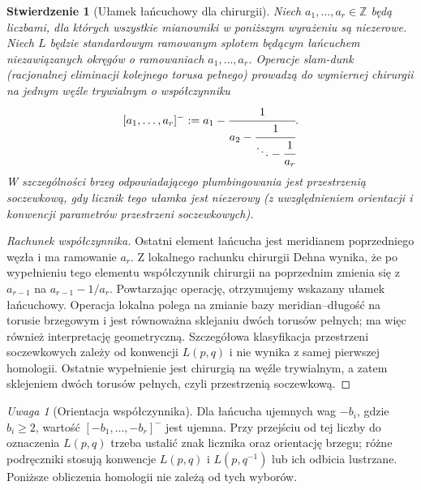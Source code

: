 \documentclass[11pt,a4paper]{report}
\numberwithin{equation}{section}
\theoremstyle{plain}
\newtheorem{stwierdzenie}[twierdzenie]{Stwierdzenie}
\theoremstyle{definition}
\theoremstyle{remark}
\newtheorem{uwaga}[twierdzenie]{Uwaga}
\begin{document}
\begin{stwierdzenie}[Ułamek łańcuchowy dla chirurgii]
Niech $a_1,\dots,a_r\in\mathbb Z$ będą liczbami,
dla których wszystkie mianowniki w poniższym wyrażeniu
są niezerowe. Niech $L$ będzie standardowym ramowanym
splotem będącym łańcuchem niezawiązanych okręgów o
ramowaniach $a_1,\dots,a_r$. Operacje \emph{slam-dunk}
(racjonalnej eliminacji kolejnego torusa pełnego)
prowadzą do wymiernej chirurgii na jednym węźle trywialnym
o współczynniku
\[
[a_1,\dots,a_r]^-:=a_1-\cfrac1{a_2-
\cfrac1{\ddots-\cfrac1{a_r}}}.
\]
W szczególności brzeg odpowiadającego plumbingowania
jest przestrzenią soczewkową, gdy licznik tego ułamka
jest niezerowy (z uwzględnieniem orientacji i konwencji
parametrów przestrzeni soczewkowych).
\end{stwierdzenie}

\begin{proof}[Rachunek współczynnika]
Ostatni element łańcucha jest meridianem poprzedniego
węzła i ma ramowanie $a_r$. Z lokalnego rachunku chirurgii
Dehna wynika, że po wypełnieniu tego elementu
współczynnik chirurgii na poprzednim zmienia się z
$a_{r-1}$ na $a_{r-1}-1/a_r$. Powtarzając operację,
otrzymujemy wskazany ułamek łańcuchowy. Operacja lokalna
polega na zmianie bazy meridian--długość na torusie
brzegowym i jest równoważna sklejaniu dwóch torusów
pełnych; ma więc również interpretację geometryczną.
Szczegółowa klasyfikacja przestrzeni soczewkowych
zależy od konwencji $L(p,q)$ i nie wynika z samej
pierwszej homologii. Ostatnie wypełnienie jest chirurgią
na węźle trywialnym, a zatem sklejeniem dwóch torusów
pełnych, czyli przestrzenią soczewkową.
\end{proof}

\begin{uwaga}[Orientacja współczynnika]
Dla łańcucha ujemnych wag $-b_i$, gdzie $b_i\ge2$,
wartość $[-b_1,\dots,-b_r]^-$ jest ujemna.
Przy przejściu od tej liczby do oznaczenia $L(p,q)$
trzeba ustalić znak licznika oraz orientację brzegu;
różne podręczniki stosują konwencje $L(p,q)$ i
$L(p,q^{-1})$ lub ich odbicia lustrzane.
Poniższe obliczenia homologii nie zależą od tych wyborów.
\end{uwaga}
\end{document}
